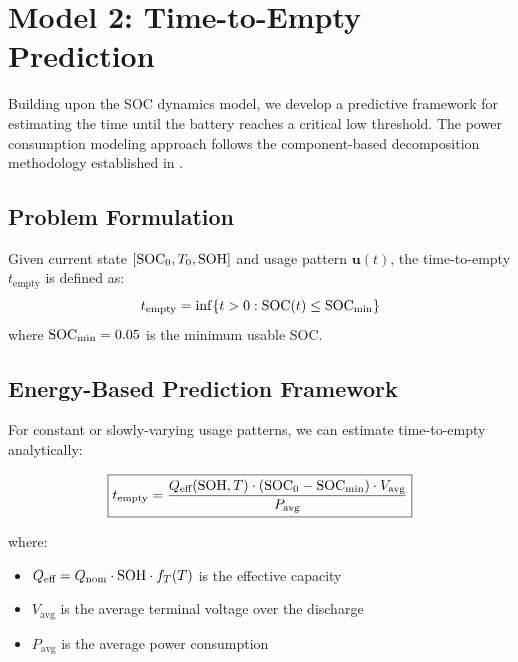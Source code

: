 \section{Model 2: Time-to-Empty Prediction}
\label{sec:model2}

Building upon the SOC dynamics model, we develop a predictive framework for estimating the time until the battery reaches a critical low threshold. The power consumption modeling approach follows the component-based decomposition methodology established in \cite{Carroll2010, Pathak2012}.

\subsection{Problem Formulation}
\label{subsec:tte_problem}

\begin{definition}
Given current state $[\text{SOC}_0, T_0, \text{SOH}]$ and usage pattern $\mathbf{u}(t)$, the time-to-empty $t_{\text{empty}}$ is defined as:
\begin{equation}
    t_{\text{empty}} = \inf\{t > 0 : \text{SOC}(t) \leq \text{SOC}_{\min}\}
    \label{eq:tte_def}
\end{equation}
where $\text{SOC}_{\min} = 0.05$ is the minimum usable SOC.
\end{definition}

\subsection{Energy-Based Prediction Framework}
\label{subsec:energy_based}

For constant or slowly-varying usage patterns, we can estimate time-to-empty analytically:

\begin{equation}
    \boxed{t_{\text{empty}} = \frac{Q_{\text{eff}}(\text{SOH}, T) \cdot (\text{SOC}_0 - \text{SOC}_{\min}) \cdot V_{\text{avg}}}{P_{\text{avg}}}}
    \label{eq:tte_estimate}
\end{equation}

where:
\begin{itemize}
    \item $Q_{\text{eff}} = Q_{\text{nom}} \cdot \text{SOH} \cdot f_T(T)$ is the effective capacity
    \item $V_{\text{avg}}$ is the average terminal voltage over the discharge
    \item $P_{\text{avg}}$ is the average power consumption
\end{itemize}

